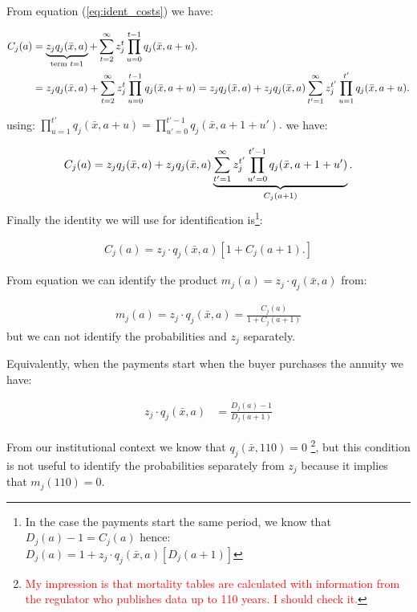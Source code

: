 \documentclass[12pt]{article}
\theoremstyle{plain}
\theoremstyle{plain}
\begin{document}
From equation (\ref{eq:ident_costs}) we have: 

\begin{align}
    C_j(a) &= \underbrace{z_j q_j(\bar{x}, a)}_{\text{term } t=1} + \sum_{t=2}^{\infty}  z_j^t  \prod_{u=0}^{t-1} q_j(\bar{x}, a+u). \notag   \\
    &= z_j q_j(\bar{x}, a)+\sum_{t=2}^{\infty} z_j^t \prod_{u=0}^{t-1} q_j(\bar{x}, a+u) = z_j q_j(\bar{x}, a)+ z_j q_j(\bar{x}, a) \sum_{t'=1}^{\infty} z_j^{t'} \prod_{u=1}^{t'} q_j(\bar{x}, a+u).
\end{align}
   
using: $ \prod_{u=1}^{t'} q_j(\bar{x}, a+u) = \prod_{u'=0}^{t'-1} q_j(\bar{x}, a+1+u'). $ we have: 

\begin{align}
    C_j(a)  =z_j q_j(\bar{x}, a)+ z_j q_j(\bar{x}, a) \underbrace{\sum_{t'=1}^{\infty} z_j^{t'}  \prod_{u'=0}^{t'-1} q_j(\bar{x}, a+1+u')}_{C_j(a+1)}. \notag
\end{align}
Finally the identity we will use for identification is\footnote{In the case the payments start the same period, we know that $D_j(a) - 1=  C_j(a) $ hence:\\ $ D_j(a)=1 + z_j \cdot q_j(\bar{x}, a)[D_j(a+1)]$ }: 

\begin{align}\label{eq:identification1}
    C_j(a) = z_j \cdot q_j(\bar{x}, a)[1+C_j(a+1).]
\end{align}

From equation \label{eq:identification1} we can identify the product $m_j(a) = z_j\cdot q_j(\bar{x}, a)$ from: 

\begin{align}\label{eq:identification2}
     m_j(a) =z_j \cdot q_j(\bar{x}, a)=\frac{C_j(a)}{1+C_j(a+1)}
\end{align}
but we can not identify the probabilities and $z_j$ separately.

Equivalently, when the payments start when the buyer purchases the annuity we have: 


\begin{align*}
    z_j \cdot q_j(\bar{x}, a) &= \frac{D_j(a)-1}{D_j(a+1)}
\end{align*}




From our institutional context we know  that   $ q_j(\bar{x},110) =0$ \footnote{\textcolor{red}{My impression is that mortality tables are calculated with information from the regulator who publishes data up to 110 years. I should check it.}}, but this condition is not useful to identify the probabilities separately from $z_j$ because it implies that $m_j(110) =0$. 
\end{document}
